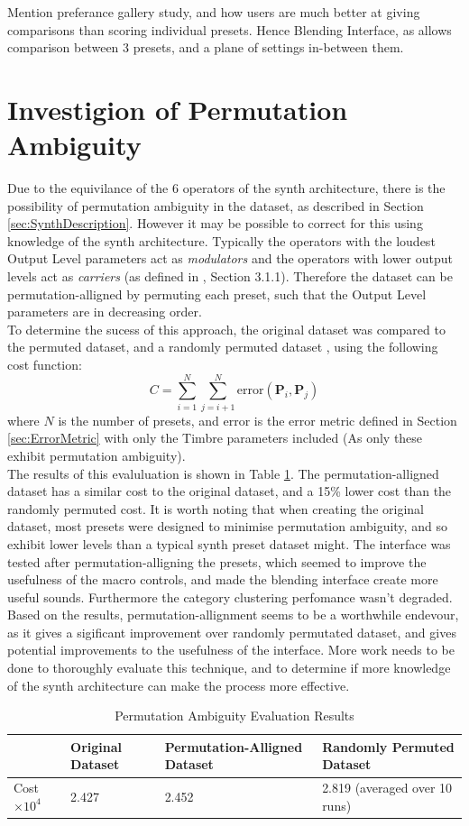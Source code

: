 \documentclass[11pt, oneside]{report}   	%
\renewcommand{\vec}[1]{\mathbf{#1}}
\begin{document}
Mention preferance gallery study, and how users are much better at giving comparisons than scoring individual presets. Hence Blending Interface, as allows comparison between 3 presets, and a plane of settings in-between them.


\section{Investigion of Permutation Ambiguity}
Due to the equivilance of the 6 operators of the synth architecture, there is the possibility of permutation ambiguity in the dataset, as described in Section \ref{sec:SynthDescription}. However it may be possible to correct for this using knowledge of the synth architecture. Typically the operators with the loudest Output Level parameters act as \emph{modulators} and the operators with lower output levels act as \emph{carriers} (as defined in \cite{YeeKing}, Section 3.1.1). Therefore the dataset can be permutation-alligned by permuting each preset, such that the Output Level parameters are in decreasing order.\\
To determine the sucess of this approach, the original dataset was compared to the permuted dataset, and a randomly permuted dataset , using the following cost function:
\begin{equation}
	C = \sum_{i = 1}^{N}\sum_{j = i+1}^{N}\mathrm{error}(\vec{P}_i, \vec{P}_j)
\end{equation}
where $N$ is the number of presets, and $\mathrm{error}$ is the error metric defined in Section \ref{sec:ErrorMetric} with only the Timbre parameters included (As only these exhibit permutation ambiguity).\\
The results of this evaluluation is shown in Table \ref{tab:PermutationAmbiguity}. The permutation-alligned dataset has a similar cost to the original dataset, and a 15\% lower cost than the randomly permuted cost. It is worth noting that when creating the original dataset, most presets were designed to minimise permutation ambiguity, and so exhibit lower levels than a typical synth preset dataset might.  The interface was tested after permutation-alligning the presets, which seemed to improve the usefulness of the macro controls, and made the blending interface create more useful sounds. Furthermore the category clustering perfomance wasn't degraded. Based on the results, permutation-allignment seems to be a worthwhile endevour, as it gives a sigificant improvement over randomly permutated dataset, and gives potential improvements to the usefulness of the interface. More work needs to be done to thoroughly evaluate this technique, and to determine if more knowledge of the synth architecture can make the process more effective.
\begin{table}[h]
	\centering
	\begin{tabular}{l|l|l|l}
		& Original Dataset & Permutation-Alligned Dataset & Randomly Permuted Dataset \\ \hline
		Cost $\times 10^4$ & 2.427            & 2.452                 & 2.819  (averaged over 10 runs)
	\end{tabular}
\caption{Permutation Ambiguity Evaluation Results}
\label{tab:PermutationAmbiguity}
\end{table}
\end{document}
